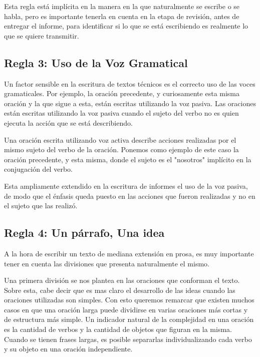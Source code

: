 \documentclass[11pt]{article}
\begin{document}
Esta regla está implícita en la manera en la que naturalmente se escribe o se habla, pero es importante
tenerla en cuenta en la etapa de revisión, antes de entregar el informe, para identificar si lo que se
está escribiendo es realmente lo que se quiere transmitir.

\subsection{Regla 3: Uso de la Voz Gramatical}
\label{sec-2-3}

Un factor sensible en la escritura de textos técnicos es el correcto uso de las voces gramaticales.
Por ejemplo, la oración precedente, y curiosamente esta misma oración y la que sigue a esta, están 
escritas utilizando la voz pasiva. Las oraciones están escritas utilizando la voz pasiva cuando el
sujeto del verbo no es quien ejecuta la acción que se está describiendo. 

Una oración escrita utilizando voz activa describe acciones realizadas por el mismo sujeto del verbo
de la oración. Ponemos como ejemplo de este caso la oración precedente, y esta misma, donde el sujeto
es el "nosotros" implícito en la conjugación del verbo.

Esta ampliamente extendido en la escritura de informes el uso de la voz pasiva, de modo que el énfasis
queda puesto en las acciones que fueron realizadas y no en el sujeto que las realizó.

\subsection{Regla 4: Un párrafo, Una idea}
\label{sec-2-4}

A la hora de escribir un texto de mediana extensión en prosa, es muy importante tener en cuenta las
divisiones que presenta naturalmente el mismo.

Una primera división se nos plantea en las oraciones que conforman el texto. Sobre esta, cabe decir 
que es mas claro el desarrollo de las ideas cuando las oraciones utilizadas son simples. Con esto
queremos remarcar que existen muchos casos en que una oración larga puede dividirse en varias 
oraciones más cortas y de estructura más simple. Un indicador natural de la complejidad en una 
oración es la cantidad de verbos y la cantidad de objetos que figuran en la misma. Cuando se tienen
frases largas, es posible separarlas individualizando cada verbo y su objeto en una oración independiente.
\end{document}
